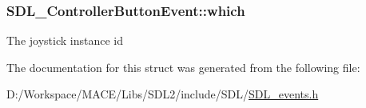\subsubsection[{\texorpdfstring{which}{which}}]{ S\+D\+L\+\_\+\+Controller\+Button\+Event\+::which}\hypertarget{struct_s_d_l___controller_button_event_a98777e88b5d5cae83eef16ffd4bcacc1}{}\label{struct_s_d_l___controller_button_event_a98777e88b5d5cae83eef16ffd4bcacc1}
The joystick instance id 

The documentation for this struct was generated from the following file\+:\begin{DoxyCompactItemize}
\item 
D\+:/\+Workspace/\+M\+A\+C\+E/\+Libs/\+S\+D\+L2/include/\+S\+D\+L/\hyperlink{_s_d_l__events_8h}{S\+D\+L\+\_\+events.\+h}\end{DoxyCompactItemize}
